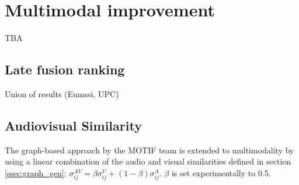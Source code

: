 \section{Multimodal improvement}
\label{sec:naming}

TBA

\subsection{Late fusion ranking}

Union of results (Eumssi, UPC)

\subsection{Audiovisual Similarity}

The graph-based approach by the MOTIF team is extended to multimodality by using a linear combination of the audio and visual similarities defined in section \ref{ssec:graph_gen}: $\sigma^{AV}_{ij} = \beta \sigma^V_{ij} + (1-\beta) \sigma^A_{ij}$. $\beta$ is set experimentally to 0.5.

\endinput
